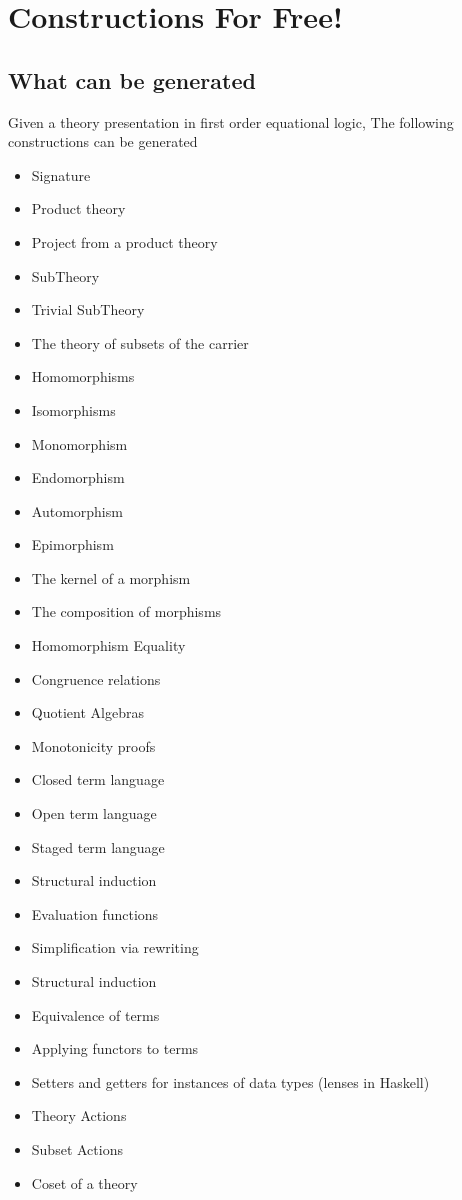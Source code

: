 \chapter{Constructions For Free!}
\label{ch:generation}

\section{What can be generated}
Given a theory presentation  in first order equational logic, The following constructions can be generated 
\begin{itemize}
    \item Signature 
    \item Product theory 
    \item Project from a product theory 
    \item SubTheory 
    \item Trivial SubTheory 
    \item The theory of subsets of the carrier 
    \item Homomorphisms 
    \item Isomorphisms 
    \item Monomorphism 
    \item Endomorphism 
    \item Automorphism 
    \item Epimorphism 
    \item The kernel of a morphism 
    \item The composition of morphisms 
    \item Homomorphism Equality 
    \item Congruence relations 
    \item Quotient Algebras
    \item Monotonicity proofs 
    \item Closed term language 
    \item Open term language 
    \item Staged term language 
    \item Structural induction 
    \item Evaluation functions 
    \item Simplification via rewriting 
    \item Structural induction 
    \item Equivalence of terms 
    \item Applying functors to terms 
    \item Setters and getters for instances of data types (lenses in Haskell) 
    \item Theory Actions 
    \item Subset Actions
    \item Coset of a theory 
\end{itemize}

